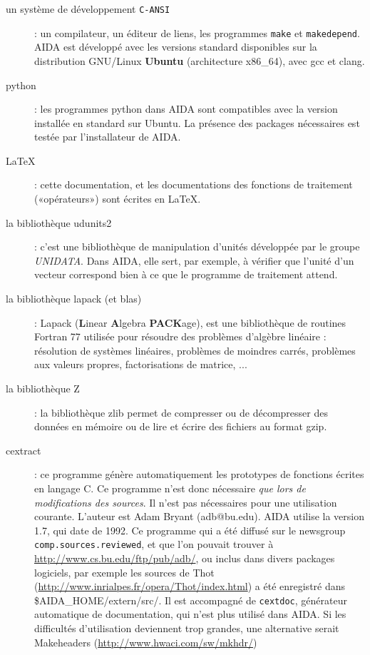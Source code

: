 \begin{description}
  \item[un système de développement \texttt{C-ANSI}] : un compilateur, un
    éditeur de liens, les programmes \texttt{make} et \texttt{makedepend}.
    AIDA est développé avec les versions standard disponibles sur la
    distribution GNU/Linux \textbf{Ubuntu} (architecture x86\_64),
    avec gcc et clang.

  \item[python] : les programmes python dans AIDA sont compatibles avec la
    version installée en standard sur Ubuntu. La présence des packages
    nécessaires est testée par l'installateur de AIDA.

  \item[\LaTeX] : cette documentation, et les documentations des fonctions de
    traitement («opérateurs») sont écrites en \LaTeX.

  \item[la bibliothèque udunits2] : c'est une bibliothèque de manipulation
    d'unités développée par le groupe \textit{UNIDATA}. Dans AIDA,
    elle sert, par exemple, à vérifier que l'unité d'un vecteur correspond
    bien à ce que le programme de traitement attend.

  \item[la bibliothèque lapack (et blas)] : Lapack (\textbf{L}inear
    \textbf{A}lgebra \textbf{PACK}age), est une bibliothèque de routines
    Fortran 77 utilisée pour résoudre des problèmes d'algèbre
    linéaire : résolution de systèmes linéaires, problèmes de moindres carrés,
    problèmes aux valeurs propres, factorisations de matrice, ...

  \item[la bibliothèque Z] : la bibliothèque zlib permet de compresser ou de
    décompresser des données en mémoire ou de lire et écrire des fichiers au
    format gzip.

  \item[cextract] : ce programme génère automatiquement les prototypes de
    fonctions écrites en langage C. Ce programme n'est donc nécessaire
    \emph{que lors de modifications des sources}. Il n'est pas nécessaires
    pour une utilisation courante. L'auteur est Adam Bryant (adb@bu.edu). AIDA
    utilise la version 1.7, qui date de 1992.
    Ce programme qui a été diffusé sur le newsgroup
    \texttt{comp}\texttt{.sources.reviewed}, et que l'on pouvait trouver à
    \url{http://www.cs.bu.edu/ftp/pub/adb/}, ou inclus dans divers packages
    logiciels, par exemple les sources de Thot
    (\url{http://www.inrialpes.fr/opera/Thot/index.html}) a été enregistré
    dans \$AIDA\_HOME/extern/src/.  Il est accompagné de
    \texttt{cextdoc}, générateur automatique de documentation, qui n'est plus
    utilisé dans AIDA.
    Si les difficultés d'utilisation deviennent trop grandes,
    une alternative serait Makeheaders (\url{http://www.hwaci.com/sw/mkhdr/})


\end{description}

